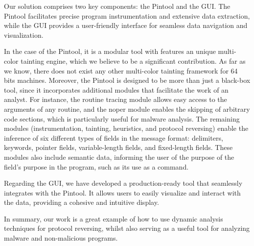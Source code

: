 \documentclass[conference]{IEEEtran}
\begin{document}
Our solution comprises two key components: the Pintool and the GUI. The Pintool facilitates precise program instrumentation and extensive 
data extraction, while the GUI provides a user-friendly interface for seamless data navigation and visualization.

In the case of the Pintool, it is a modular tool with features an unique multi-color tainting engine, which we believe
to be a significant contribution. As far as we know, there does not exist any other multi-color
tainting framework for 64 bits machines. Moreover, the Pintool is designed to be more than just a black-box tool, since
it incorporates additional modules that facilitate the work of an analyst. For instance, the routine tracing module 
allows easy access to the arguments of any routine, and the noper module enables the skipping of arbitrary code sections, 
which is particularly useful for malware analysis. The remaining modules (instrumentation, tainting, heuristics, and protocol reversing)
enable the inference of six different types of fields in the message format: delimiters, keywords, pointer fields, variable-length fields,
and fixed-length fields. These modules also include semantic data, informing the user of the purpose of the field's purpose in the program, 
such as its use as a command.

Regarding the GUI, we have developed a production-ready tool that seamlessly integrates with the Pintool. 
It allows users to easily visualize and interact with the data, providing a cohesive and intuitive display.

In summary, our work is a great example of how to use dynamic analysis techniques for protocol reversing, whilst
also serving as a useful tool for analyzing malware and non-malicious programs. 
\end{document}
